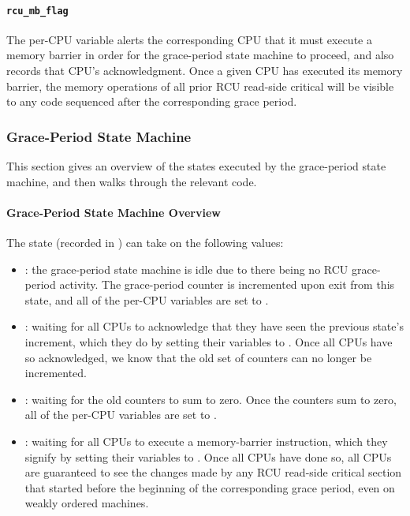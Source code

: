 \paragraph{{\tt rcu\_mb\_flag}}
\label{app:rcuimpl:rcu_mb_flag}

The  per-CPU variable alerts the corresponding
CPU that it must execute a memory barrier in order for the grace-period
state machine to proceed, and also records that CPU's acknowledgment.
Once a given CPU has executed its memory barrier, the memory operations
of all prior RCU read-side critical will be visible to any code sequenced
after the corresponding grace period.


\subsubsection{Grace-Period State Machine}
\label{app:rcuimpl:Grace-Period State Machine}

This section gives an overview of the states executed by the grace-period
state machine, and then walks through the relevant code.

\paragraph{Grace-Period State Machine Overview}
\label{app:rcuimpl:Grace-Period State Machine Overview}

The state (recorded in )
can take on the following values:

\begin{itemize}
\item	{}:  the grace-period state
	machine is idle due to there being no RCU grace-period activity.
	The  grace-period counter
	is incremented upon exit from this state, and all of the
	per-CPU  variables are set
	to .
\item	{}:
	waiting for all CPUs to acknowledge that they have seen the
	previous state's increment, which they do by setting their
	 variables to .
	Once all CPUs have so acknowledged, we know that the old
	set of counters can no longer be incremented.
\item	{}:
	waiting for the old counters to sum to zero.
	Once the counters sum to zero, all of the per-CPU
	 variables are set to
	.
\item	{}:
	waiting for all CPUs to execute a memory-barrier instruction,
	which they signify by setting their 
	variables to .
	Once all CPUs have done so, all CPUs are guaranteed to see
	the changes made by any RCU read-side critical section that
	started before the beginning of the corresponding grace period,
	even on weakly ordered machines.
\end{itemize}

